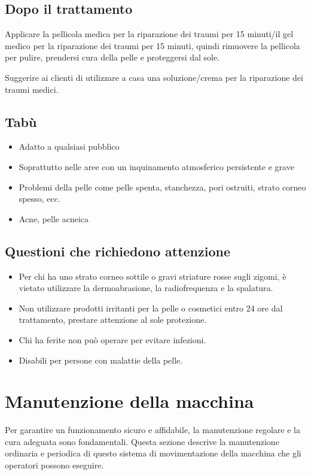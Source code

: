 \documentclass[a4paper]{article}
\begin{document}
\subsection{Dopo il trattamento}
Applicare la pellicola medica per la riparazione dei traumi per 15 minuti/il gel medico per la riparazione dei traumi per 15 minuti, quindi rimuovere la pellicola per pulire, prendersi cura della pelle e proteggersi dal sole.

Suggerire ai clienti di utilizzare a casa una soluzione/crema per la riparazione dei traumi medici.

\subsection{Tabù}
\begin{itemize}
  \item Adatto a qualsiasi pubblico
  \item Soprattutto nelle aree con un inquinamento atmosferico persistente e grave
  \item Problemi della pelle come pelle spenta, stanchezza, pori ostruiti, strato corneo spesso, ecc.
  \item Acne, pelle acneica
\end{itemize}

\subsection{Questioni che richiedono attenzione}
\begin{itemize}
  \item Per chi ha uno strato corneo sottile o gravi striature rosse sugli zigomi, è vietato utilizzare la dermoabrasione, la radiofrequenza e la spalatura.
  \item Non utilizzare prodotti irritanti per la pelle o cosmetici entro 24 ore dal trattamento, prestare attenzione al sole protezione.
  \item Chi ha ferite non può operare per evitare infezioni.
  \item Disabili per persone con malattie della pelle.
\end{itemize}

\section{Manutenzione della macchina}
Per garantire un funzionamento sicuro e affidabile, la manutenzione regolare e la cura adeguata sono fondamentali. Questa sezione descrive la manutenzione ordinaria e periodica di questo sistema di movimentazione della macchina che gli operatori possono eseguire.
\end{document}
